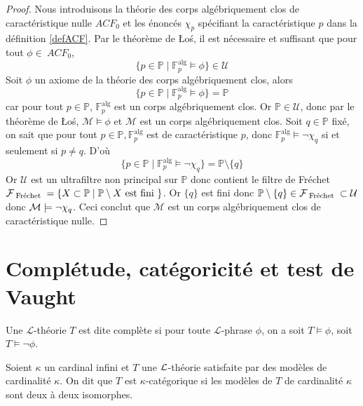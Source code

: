 \begin{proof}
Nous introduisons la théorie des corps algébriquement clos de caractéristique nulle $ACF_0$ et les énoncés $\chi_p$ spécifiant la caractéristique $p$ dans la définition \ref{defACF}.
Par le théorème de \L{}oś, il est nécessaire et suffisant que pour tout $\phi \in~ACF_0$,
\[ \{p \in \mathbb{P} \mid \mathbb{F}^{\text{alg}}_p \models \phi \} \in \mathcal{U} \]
Soit $\phi$ un axiome de la théorie des corps algébriquement clos, alors
\[ \{p \in \mathbb{P} \mid \mathbb{F}^{\text{alg}}_p \models \phi \} = \mathbb{P} \]
car pour tout $p \in \mathbb{P}$, $\mathbb{F}^{\text{alg}}_p$ est un corps algébriquement clos. Or $\mathbb{P} \in \mathcal{U}$, 
donc par le théorème de \L{}oś, $\mathcal{M} \models \phi$ et $\mathcal{M}$ est un corps algébriquement clos. Soit $q \in \mathbb{P}$ fixé, on sait que 
pour tout $p \in \mathbb{P}, \mathbb{F}^{\text{alg}}_p$ est de caractéristique $p$, donc $\mathbb{F}^{\text{alg}}_p \models \neg \chi_q$
si et seulement si $p \ne q$. D'où 
\[ \{p \in \mathbb{P} \mid \mathbb{F}^{\text{alg}}_p \models \neg\chi_q \} = \mathbb{P} \setminus \{q\} \]
Or $\mathcal{U}$ est un ultrafiltre non principal sur $\mathbb{P}$ donc contient le filtre de Fréchet $\mathcal{F}_{\text{ Fréchet }} = \{ X \subset \mathbb{P} \mid \mathbb{P}
\setminus X \text{ est fini } \}$.  Or $\{q\}$ est fini donc $\mathbb{P} \setminus \{q\} \in \mathcal{F}_{\text{ Fréchet }} \subset \mathcal{U}$ donc $\mathcal{M} \models \neg\chi_q$.
Ceci conclut que $\mathcal{M}$ est un corps algébriquement clos de caractéristique nulle.
\end{proof}

\section{Complétude, catégoricité et test de Vaught}

\begin{defi}
Une $\mathcal{L}$-théorie $T$ est dite complète si pour toute $\mathcal{L}$-phrase $\phi$, on a soit $T \models \phi$, soit $T \models \neg\phi$.
\end{defi}


\begin{defi}[Categoricité]
Soient $\kappa$ un cardinal infini et $T$ une $\mathcal{L}$-théorie satisfaite par des modèles de cardinalité $\kappa$.
On dit que $T$ est $\kappa$-catégorique si les modèles de $T$ de cardinalité $\kappa$ sont deux à deux isomorphes.
\end{defi}

